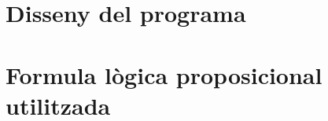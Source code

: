 \documentclass[a4paper,12pt]{article}
\begin{document}
	\begin{titlepage}
		\maketitle
		\thispagestyle{empty}
	\end{titlepage}
	\cleardoublepage
	\newpage

\tableofcontents
\listoffigures
\thispagestyle{empty}

\newpage

\section{Disseny del programa}


\newpage

\section{Formula lògica proposicional utilitzada}
\end{document}
